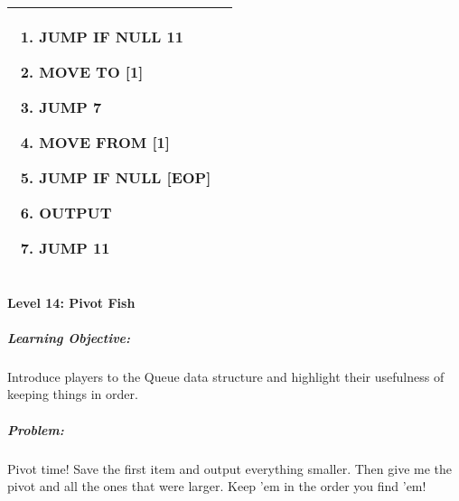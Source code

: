 \begin{center}
\begin{tabular}{ | m{6cm} | m{8cm} | }
\begin{enumerate}
                \item JUMP IF NULL 11
                \item MOVE TO [1]
                \item JUMP 7
                \item MOVE FROM [1]
                \item JUMP IF NULL [EOP]
                \item OUTPUT
                \item JUMP 11
            \end{enumerate}
            \\
        \hline
    \end{tabular}
\end{center}


\paragraph{Level 14: Pivot Fish}
\subparagraph{Learning Objective:} Introduce players to the Queue data structure and highlight their usefulness of keeping things in order.

\subparagraph{Problem:} Pivot time! Save the first item and output everything smaller. Then give me the pivot and all the ones that were larger. Keep 'em in the order you find 'em!

